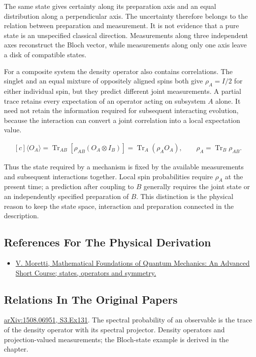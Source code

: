 \documentclass[11pt,oneside]{book}
\newenvironment{centeredalign}{\[\begin{gathered}[c]}{\end{gathered}\]}
\begin{document}
The same state gives certainty along its preparation axis and an equal distribution along a perpendicular axis. The uncertainty therefore belongs to the relation between preparation and measurement. It is not evidence that a pure state is an unspecified classical direction. Measurements along three independent axes reconstruct the Bloch vector, while measurements along only one axis leave a disk of compatible states.

For a composite system the density operator also contains correlations. The singlet and an equal mixture of oppositely aligned spins both give \(\rho_A=I/2\) for either individual spin, but they predict different joint measurements. A partial trace retains every expectation of an operator acting on subsystem \(A\) alone. It need not retain the information required for subsequent interacting evolution, because the interaction can convert a joint correlation into a local expectation value.

\begin{centeredalign}
\langle O_A\rangle=\operatorname{Tr}_{AB}[\rho_{AB}(O_A\otimes I_B)]
=\operatorname{Tr}_A(\rho_A O_A),\qquad \rho_A=\operatorname{Tr}_B\rho_{AB}.
\end{centeredalign}

Thus the state required by a mechanism is fixed by the available measurements and subsequent interactions together. Local spin probabilities require \(\rho_A\) at the present time; a prediction after coupling to \(B\) generally requires the joint state or an independently specified preparation of \(B\). This distinction is the physical reason to keep the state space, interaction and preparation connected in the description.

\subsection*{References For The Physical Derivation}
\begin{itemize}
\item \href{https://arxiv.org/abs/1508.06951}{V. Moretti, Mathematical Foundations of Quantum Mechanics: An Advanced Short Course; states, operators and symmetry.}
\end{itemize}

\subsection*{Relations In The Original Papers}

\href{https://arxiv.org/html/1508.06951#S3.Ex131}{arXiv:1508.06951, S3.Ex131}. The spectral probability of an observable is the trace of the density operator with its spectral projector. Density operators and projection-valued measurements; the Bloch-state example is derived in the chapter.
\end{document}
